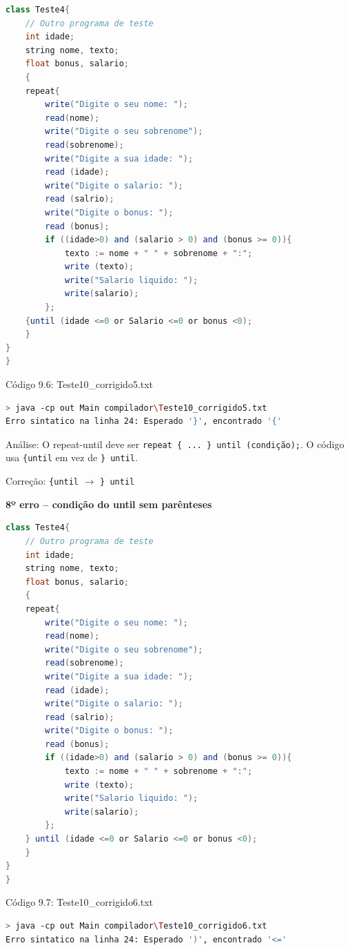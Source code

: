 \documentclass[12pt,a4paper]{article}
\begin{document}
\begin{lstlisting}[language=Java]
class Teste4{
    // Outro programa de teste
    int idade;
    string nome, texto;
    float bonus, salario;
    {
    repeat{
        write("Digite o seu nome: ");
        read(nome);
        write("Digite o seu sobrenome");
        read(sobrenome);
        write("Digite a sua idade: ");
        read (idade);
        write("Digite o salario: ");
        read (salrio);
        write("Digite o bonus: ");
        read (bonus);
        if ((idade>0) and (salario > 0) and (bonus >= 0)){
            texto := nome + " " + sobrenome + ":";
            write (texto);
            write("Salario liquido: ");
            write(salario);
        };
    {until (idade <=0 or Salario <=0 or bonus <0);
    }
}
}
\end{lstlisting}

Código 9.6: Teste10\_corrigido5.txt

\begin{lstlisting}[language=bash]
> java -cp out Main compilador\Teste10_corrigido5.txt
Erro sintatico na linha 24: Esperado '}', encontrado '{'
\end{lstlisting}

Análise: O repeat-until deve ser \texttt{repeat \{ ... \} until (condição);}. O código usa \texttt{\{until} em vez de \texttt{\} until}.

Correção: \texttt{\{until} $\to$ \texttt{\} until}

\textbf{8º erro -- condição do until sem parênteses}

\begin{lstlisting}[language=Java]
class Teste4{
    // Outro programa de teste
    int idade;
    string nome, texto;
    float bonus, salario;
    {
    repeat{
        write("Digite o seu nome: ");
        read(nome);
        write("Digite o seu sobrenome");
        read(sobrenome);
        write("Digite a sua idade: ");
        read (idade);
        write("Digite o salario: ");
        read (salrio);
        write("Digite o bonus: ");
        read (bonus);
        if ((idade>0) and (salario > 0) and (bonus >= 0)){
            texto := nome + " " + sobrenome + ":";
            write (texto);
            write("Salario liquido: ");
            write(salario);
        };
    } until (idade <=0 or Salario <=0 or bonus <0);
    }
}
}
\end{lstlisting}

Código 9.7: Teste10\_corrigido6.txt

\begin{lstlisting}[language=bash]
> java -cp out Main compilador\Teste10_corrigido6.txt
Erro sintatico na linha 24: Esperado ')', encontrado '<='
\end{lstlisting}
\end{document}
